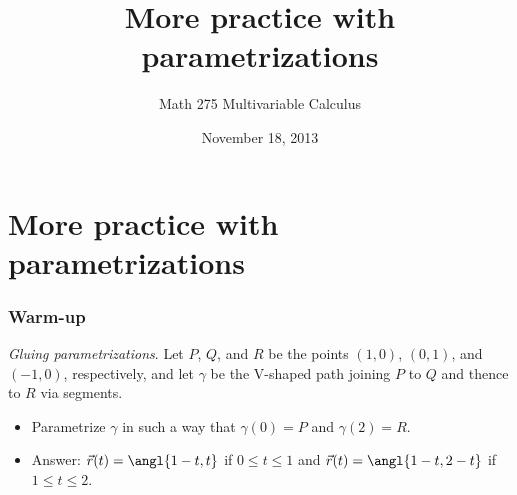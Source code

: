 \documentclass[11pt,ignorenonframetext,aspectratio=169,xcolor={svgnames}]{beamer}
\title{More practice with parametrizations}
\author{Math 275 Multivariable Calculus}
\date{November 18, 2013}
\begin{document}
\frame{\titlepage}

\section{More practice with parametrizations}



\begin{frame}\frametitle{Warm-up}

\emph{Gluing parametrizations}. Let $P$, $Q$, and $R$ be the points
$(1,0)$, $(0,1)$, and $(-1,0)$, respectively, and let $\gamma$ be the
V-shaped path joining $P$ to $Q$ and thence to $R$ via segments.

\begin{itemize}[<+->]
\itemsep1pt\parskip0pt
\item
  Parametrize $\gamma$ in such a way that $\gamma(0) = P$ and
  $\gamma(2) = R$.
\item
  Answer: $\vec{r}(t) = \angl{1-t, t}$ if $0 \leq t \leq 1$ and
  $\vec{r}(t) = \angl{1-t, 2-t}$ if $1 \leq t \leq 2$.
\end{itemize}

\end{frame}
\end{document}
